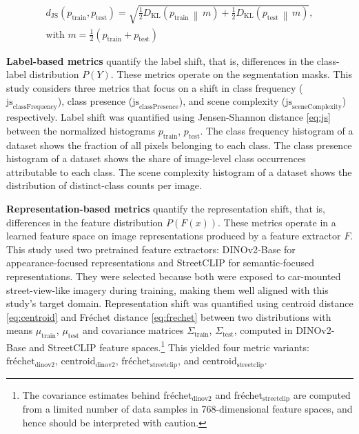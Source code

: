 \documentclass[conference]{IEEEtran}
\begin{document}
\begin{equation}
\label{eq:js}
\begin{split}
d_{\text{JS}}(p_{\text{train}}, p_{\text{test}})
= \sqrt{
\frac{1}{2} D_{\text{KL}}\!\left( p_{\text{train}} \,\middle\|\, m \right)
+
\frac{1}{2} D_{\text{KL}}\!\left( p_{\text{test}} \,\middle\|\, m \right)
}, \\
\text{with } m = \frac{1}{2}\left(p_{\text{train}} + p_{\text{test}}\right)
\end{split}
\end{equation}

\textbf{Label-based metrics} quantify the label shift, that is, differences in the class-label distribution $P(Y)$. These metrics operate on the segmentation masks. This study considers three metrics that focus on a shift in class frequency ($\text{js}_{\text{classFrequency}}$), class presence ($\text{js}_{\text{classPresence}}$), and scene complexity ($\text{js}_{\text{sceneComplexity}}$) respectively. Label shift was quantified using Jensen-Shannon distance \eqref{eq:js} between the normalized histograms $p_{\text{train}}$, $p_{\text{test}}$. The class frequency histogram of a dataset shows the fraction of all pixels belonging to each class. The class presence histogram of a dataset shows the share of image-level class occurrences attributable to each class. The scene complexity histogram of a dataset shows the distribution of distinct-class counts per image.

\textbf{Representation-based metrics} quantify the representation shift, that is, differences in the feature distribution $P(F(x))$. These metrics operate in a learned feature space on image representations produced by a feature extractor $F$. This study used two pretrained feature extractors: DINOv2‑Base \cite{oquab2024} for appearance‑focused representations and StreetCLIP \cite{haas2023} for semantic‑focused representations. They were selected because both were exposed to car-mounted street-view-like imagery during training, making them well aligned with this study's target domain. Representation shift was quantified using centroid distance \eqref{eq:centroid} and Fréchet distance \eqref{eq:frechet} \cite{NIPS2017_8a1d6947} between two distributions with means $\mu_{\text{train}}$, $\mu_{\text{test}}$ and covariance matrices $\Sigma_{\text{train}}$, $\Sigma_{\text{test}}$, computed in DINOv2-Base and StreetCLIP feature spaces.\footnote{The covariance estimates behind fréchet$_{\text{dinov2}}$ and fréchet$_{\text{streetclip}}$ are computed from a limited number of data samples in 768-dimensional feature spaces, and hence should be interpreted with caution.} This yielded four metric variants: $\text{fréchet}_{\text{dinov2}}$, $\text{centroid}_{\text{dinov2}}$, $\text{fréchet}_{\text{streetclip}}$, and $\text{centroid}_{\text{streetclip}}$.
\end{document}
